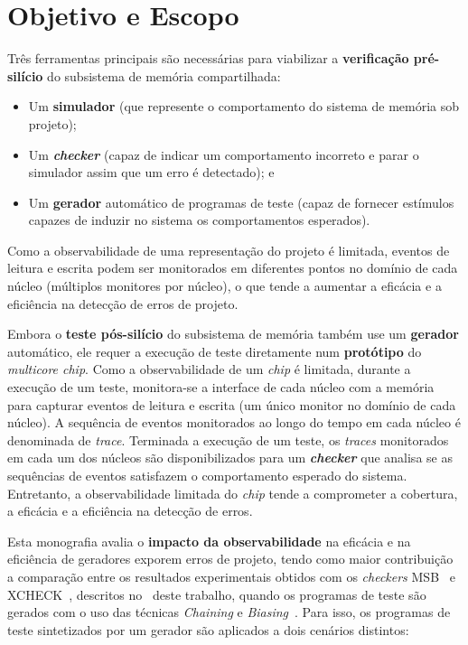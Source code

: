 \section{Objetivo e Escopo}

Três ferramentas principais são necessárias para viabilizar a
\textbf{verificação pré-silício} do subsistema de memória compartilhada:

\begin{itemize}
    \item Um \textbf{simulador} (que represente o comportamento do sistema de
        memória sob projeto);
    \item Um \textbf{\textit{checker}} (capaz de indicar um comportamento
        incorreto e parar o simulador assim que um erro é detectado); e
    \item Um \textbf{gerador} automático de programas de teste (capaz de
        fornecer estímulos capazes de induzir no sistema os comportamentos
        esperados).
\end{itemize}

Como a observabilidade de uma representação do projeto é limitada, eventos de
leitura e escrita podem ser monitorados em diferentes pontos no domínio de cada
núcleo (múltiplos monitores por núcleo), o que tende a aumentar a eficácia e a
eficiência na detecção de erros de projeto.

Embora o \textbf{teste pós-silício} do subsistema de memória também use um
\textbf{gerador} automático, ele requer a execução de teste diretamente num
\textbf{protótipo} do \textit{multicore chip}. Como a observabilidade de um
\textit{chip} é limitada, durante a execução de um teste, monitora-se a
interface de cada núcleo com a memória para capturar eventos de leitura e
escrita (um único monitor no domínio de cada núcleo). A sequência de eventos
monitorados ao longo do tempo em cada núcleo é denominada de \textit{trace}.
Terminada a execução de um teste, os \textit{traces} monitorados em cada um dos
núcleos são disponibilizados para um \textbf{\textit{checker}} que analisa se
as sequências de eventos satisfazem o comportamento esperado do sistema.
Entretanto, a observabilidade limitada do \textit{chip} tende a comprometer a
cobertura, a eficácia e a eficiência na detecção de erros.

Esta monografia avalia o \textbf{impacto da observabilidade} na eficácia e na
eficiência de geradores exporem erros de projeto, tendo como maior contribuição
a comparação entre os resultados experimentais obtidos com os \textit{checkers}
MSB~\cite{Freitas:2013} e XCHECK~\cite{Hu:2012}, descritos no~
deste trabalho, quando os programas de teste são gerados com o uso das técnicas
\textit{Chaining} e \textit{Biasing}~\cite{Andrade:2019}. Para isso, os
programas de teste sintetizados por um gerador são aplicados a dois cenários
distintos:

